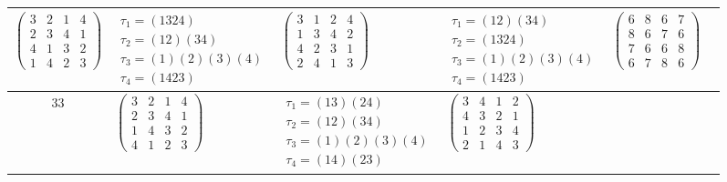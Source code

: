 \begin{longtable}{|c|p{2.7cm}|p{2.7cm}|p{2.7cm}|p{2.7cm}|p{2.7cm}|}
    $\begin{pmatrix} 3 & 2 & 1 & 4 \\ 2 & 3 & 4 & 1 \\ 4 & 1 & 3 & 2 \\ 1 & 4 & 2 & 3 \end{pmatrix}$               &
    $\begin{array}{l}\tau_{1}=(1324)\\ \tau_{2}=(12)(34)\\ \tau_{3}=(1)(2)(3)(4)\\ \tau_{4}=(1423)\end{array}$     &
    $\begin{pmatrix} 3 & 1 & 2 & 4 \\ 1 & 3 & 4 & 2 \\ 4 & 2 & 3 & 1 \\ 2 & 4 & 1 & 3 \end{pmatrix}$               &
    $\begin{array}{l}\tau_{1}=(12)(34)\\ \tau_{2}=(1324)\\ \tau_{3}=(1)(2)(3)(4)\\ \tau_{4}=(1423)\end{array}$     &
    $\begin{pmatrix} 6 & 8 & 6 & 7 \\ 8 & 6 & 7 & 6 \\ 7 & 6 & 6 & 8 \\ 6 & 7 & 8 & 6 \end{pmatrix}$                                                                                           \\
    \hline
    33                                                                                                             &
    $\begin{pmatrix} 3 & 2 & 1 & 4 \\ 2 & 3 & 4 & 1 \\ 1 & 4 & 3 & 2 \\ 4 & 1 & 2 & 3 \end{pmatrix}$               &
    $\begin{array}{l}\tau_{1}=(13)(24)\\ \tau_{2}=(12)(34)\\ \tau_{3}=(1)(2)(3)(4)\\ \tau_{4}=(14)(23)\end{array}$ &
    $\begin{pmatrix} 3 & 4 & 1 & 2 \\ 4 & 3 & 2 & 1 \\ 1 & 2 & 3 & 4 \\ 2 & 1 & 4 & 3 \end{pmatrix}$               &

\end{longtable}
